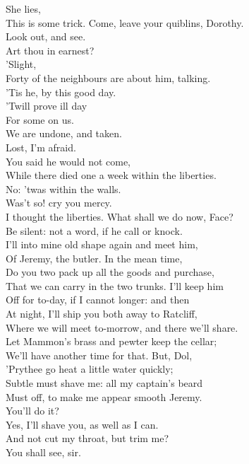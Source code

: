 \documentclass{memoir}
\begin{document}
\begin{drama*}
\facespeaks {} She lies,\\
 This is some trick. Come, leave your quiblins, Dorothy.\\
\dolspeaks  Look out, and see.\\
\subtlespeaks {} Art thou in earnest?\\
\dolspeaks {} 'Slight,\\
 Forty of the neighbours are about him, talking.\\
\facespeaks  'Tis he, by this good day.\\
\dolspeaks {} 'Twill prove ill day\\
 For some on us.\\
\facespeaks {} We are undone, and taken.\\
\dolspeaks  Lost, I'm afraid.\\
\subtlespeaks {} You said he would not come,\\
 While there died one a week within the liberties.\\
\facespeaks  No: 'twas within the walls.\\
\subtlespeaks {} Was't so! cry you mercy.\\
 I thought the liberties. What shall we do now, Face?\\
\facespeaks  Be silent: not a word, if he call or knock.\\
 I'll into mine old shape again and meet him,\\
 Of Jeremy, the butler. In the mean time,\\
 Do you two pack up all the goods and purchase,\\
 That we can carry in the two trunks. I'll keep him\\
 Off for to-day, if I cannot longer: and then\\
 At night, I'll ship you both away to Ratcliff,\\
 Where we will meet to-morrow, and there we'll share.\\
 Let Mammon's brass and pewter keep the cellar;\\
 We'll have another time for that. But, Dol,\\
 'Prythee go heat a little water quickly;\\
 Subtle must shave me: all my captain's beard\\
 Must off, to make me appear smooth Jeremy.\\
 You'll do it?\\
\subtlespeaks {} Yes, I'll shave you, as well as I can.\\
\facespeaks  And not cut my throat, but trim me?\\
\subtlespeaks {} You shall see, sir.\\
\act


\end{drama*}
\end{document}

